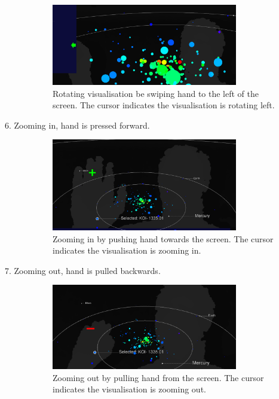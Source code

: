 \begin{description}
\begin{figure}[H]
  \centering
      \includegraphics[width=0.8\textwidth]{images/left.PNG}
  \caption[Rotating visualisation be swiping hand]{Rotating visualisation be
swiping hand to the left of the screen. The cursor indicates the visualisation
is rotating left.}
  \label{fig:left}
\end{figure}

 \item[6. Zooming in, hand is pressed forward.]
 \begin{figure}[H]
  \centering
      \includegraphics[width=0.8\textwidth]{images/in.PNG}
  \caption[Zooming in by pushing hand]{Zooming in by pushing hand towards the
screen. The cursor indicates the visualisation is zooming in.}
  \label{fig:in}
\end{figure}

 \item[7. Zooming out, hand is pulled backwards.]
 
\begin{figure}[H]
  \centering
      \includegraphics[width=0.8\textwidth]{images/out.PNG}
\caption[Zooming out by pulling hand]{Zooming out by pulling hand from the
screen. The cursor indicates the visualisation is zooming out.}
  \label{fig:out}
\end{figure}

\end{description}

